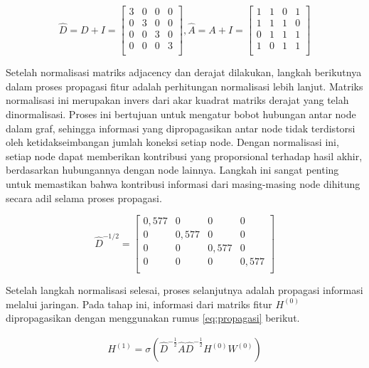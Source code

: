 \vspace{0.3cm}
   $$
   \hat{D} = D + I = \begin{bmatrix}
   3 & 0 & 0 & 0 \\
   0 & 3 & 0 & 0 \\
   0 & 0 & 3 & 0 \\
   0 & 0 & 0 & 3 \\
   \end{bmatrix}
   ,
   \hat{A} = A + I = \begin{bmatrix}
   1 & 1 & 0 & 1 \\
   1 & 1 & 1 & 0 \\
   0 & 1 & 1 & 1 \\
   1 & 0 & 1 & 1 \\
   \end{bmatrix}
   $$
\vspace{0.5cm}\par
Setelah normalisasi matriks adjacency dan derajat dilakukan, langkah berikutnya dalam proses propagasi fitur adalah perhitungan normalisasi lebih lanjut. Matriks normalisasi ini merupakan invers dari akar kuadrat matriks derajat yang telah dinormalisasi. Proses ini bertujuan untuk mengatur bobot hubungan antar node dalam graf, sehingga informasi yang dipropagasikan antar node tidak terdistorsi oleh ketidakseimbangan jumlah koneksi setiap node. Dengan normalisasi ini, setiap node dapat memberikan kontribusi yang proporsional terhadap hasil akhir, berdasarkan hubungannya dengan node lainnya. Langkah ini sangat penting untuk memastikan bahwa kontribusi informasi dari masing-masing node dihitung secara adil selama proses propagasi.\par
\vspace{0.3cm}
   $$
   \hat{D}^{-1/2} = \begin{bmatrix}
   0,577 & 0 & 0 & 0 \\
   0 & 0,577 & 0 & 0 \\
   0 & 0 & 0,577 & 0 \\
   0 & 0 & 0 & 0,577 \\
   \end{bmatrix}
   $$
\vspace{0.5cm}\par
Setelah langkah normalisasi selesai, proses selanjutnya adalah propagasi informasi melalui jaringan. Pada tahap ini, informasi dari matriks fitur $H^{(0)}$ dipropagasikan dengan menggunakan rumus \ref{eq:propagasi} berikut.\par
\vspace{0.2cm}
\begin{align*}
    H^{(1)} = \sigma \left( \hat{D}^{- \frac{1}{2}} \hat{A} \hat{D}^{- \frac{1}{2}} H^{(0)} W^{(0)} \right)\\
\end{align*}

